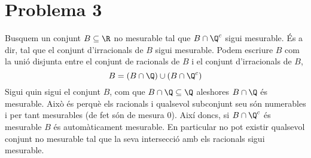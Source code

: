 \documentclass[12pt]{article}
\begin{document}
\section*{Problema 3}
Busquem un conjunt \( B \subseteq \R \) no mesurable tal que \( B \cap \Q^c \) sigui
mesurable. És a dir, tal que el conjunt d'irracionals de \( B \) sigui mesurable. Podem
escriure \( B \) com la unió disjunta entre el conjunt de racionals de \( B \) i el
conjunt d'irracionals de \( B \),
\begin{equation*}
	B = (B \cap \Q) \cup (B \cap \Q^c) 
\end{equation*}
Sigui quin sigui el conjunt \( B \), com que \( B \cap \Q \subseteq \Q \) aleshores \( B
\cap \Q \) és mesurable. Això és perquè els racionals i qualsevol subconjunt seu són
numerables i per tant mesurables (de fet són de mesura 0). Així doncs, si \( B \cap \Q^c
\) és mesurable \( B \) és automàticament mesurable. En particular no pot existir
qualsevol conjunt no mesurable tal que la seva intersecció amb els racionals sigui
mesurable.
\end{document}

